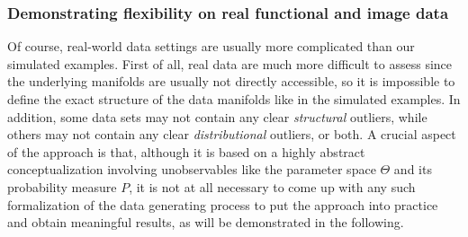 \documentclass[
  10pt]{article}
\begin{document}
\subsubsection{Demonstrating flexibility on real functional and image data}

Of course, real-world data settings are usually more complicated than our simulated examples. First of all,
real data are much more difficult to assess since the underlying manifolds are usually not directly accessible, so it is impossible to define the exact structure of the data manifolds like in the simulated examples. In addition, some data sets may not contain any clear \textit{structural} outliers, while others may not contain any clear \textit{distributional} outliers, or both. A crucial aspect of the approach is that, although it is based on a highly abstract conceptualization involving unobservables like the parameter space \(\Theta\) and its probability measure \(P\), it is not at all necessary to come up with any such formalization of the data generating process to put the approach into practice and obtain meaningful results, as will be demonstrated in the following.
\end{document}
